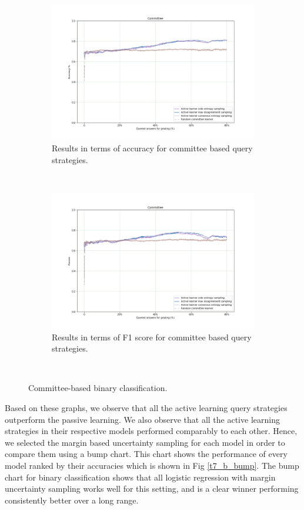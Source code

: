 \begin{figure}[!htb]
	\begin{subfigure}[b]{0.5\textwidth}
		\includegraphics[width=\textwidth]{images/binary/task7_accuracy_com}
		\caption{Results in terms of accuracy for committee based query strategies.}
		\label{t7_b_com}
	\end{subfigure}
	~
	\begin{subfigure}[b]{0.5\textwidth}
		\includegraphics[width=\textwidth]{images/binary/task7_f1score_com}
		\caption{Results in terms of F1 score for committee based query strategies.}
		\label{t7_b_com_f1}
	\end{subfigure}
	~
	\caption{Committee-based binary classification.}
\end{figure}

Based on these graphs, we observe that all the active learning query strategies outperform the passive learning. We also observe that all the active learning strategies in their respective models performed comparably to each other. Hence, we selected the margin based uncertainty sampling for each model in order to compare them using a bump chart. This chart shows the performance of every model ranked by their accuracies which is shown in Fig \ref{t7_b_bump}. The bump chart for binary classification shows that all logistic regression with margin uncertainty sampling works well for this setting, and is a clear winner performing consistently better over a long range. 

